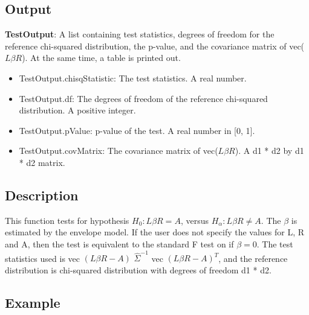 \documentclass[a4paper,11pt,openany]{memoir}
\begin{document}
\subsection*{Output}

\begin{par}
\textbf{TestOutput}: A list containing test statistics, degrees of freedom for the reference chi-squared distribution, the p-value, and the covariance matrix of vec($L\beta R$).  At the same time, a table is printed out.
\end{par} \vspace{1em}
\begin{itemize}
\setlength{\itemsep}{-1ex}
   \item TestOutput.chisqStatistic: The test statistics. A real number.
   \item TestOutput.df: The degrees of freedom of the reference chi-squared distribution.  A positive integer.
   \item TestOutput.pValue: p-value of the test.  A real number in [0, 1].
   \item TestOutput.covMatrix: The covariance matrix of vec($L\beta R$). A d1 * d2 by d1 * d2 matrix.
\end{itemize}

\subsection*{Description}

\begin{par}
This function tests for hypothesis $H_0: L\beta R = A$, versus $H_\alpha: L\beta R\neq A$.  The $\beta$ is estimated by the envelope model.  If the user does not specify the values for L, R and A, then the test is equivalent to the standard F test on if $\beta = 0$.  The test statistics used is vec $(L\beta R - A)$ $\hat{\Sigma}^{-1}$ vec $(L\beta R - A)^{T}$, and the reference distribution is chi-squared distribution with degrees of freedom d1 * d2.
\end{par} \vspace{1em}


\subsection*{Example}
\end{document}
